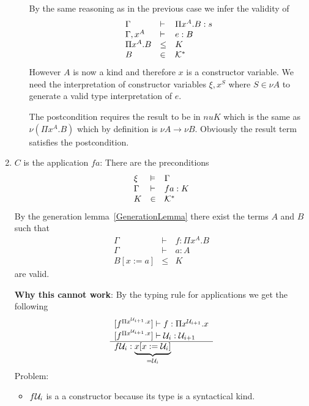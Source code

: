 \begin{definition}
\begin{enumerate}
\begin{enumerate}
            By the same reasoning as in the previous case we infer the validity
            of
            $$
            \begin{array}{lll}
                \Gamma &\vdash& \Pi x^A. B: s
                \\
                \Gamma,x^A &\vdash& e : B
                \\
                \Pi x^A. B &\le& K
                \\
                B &\in& {\cal K}^*
            \end{array}
            $$
            However $A$ is now a kind and therefore $x$ is a constructor
            variable. We need the interpretation of constructor variables
            $\xi,x^S$ where $S \in \nu A$ to generate a valid type
            interpretation of $e$.

            The postcondition requires the result to be in $nu K$ which is the
            same as $\nu (\Pi x^A.B)$ which by definition is $\nu A \to \nu B$.
            Obviously the result term satisfies the postcondition.

        \end{enumerate}

    \item $C$ is the application $f a$:
        There are the preconditions
        $$
        \begin{array}{lll}
            \xi &\vDash& \Gamma
            \\
            \Gamma &\vdash& f a: K
            \\
            K &\in& {\cal K}^*
        \end{array}
        $$
        By the generation lemma~\ref{GenerationLemma} there exist the terms $A$
        and $B$ such that
        $$
        \begin{array}{lll}
            \Gamma &\vdash& f: \Pi x^A. B
            \\
            \Gamma &\vdash& a: A
            \\
            B[x:=a] &\le& K
        \end{array}
        $$
        are valid.

        {\bf Why this cannot work}:
        By the typing rule for applications we get the following
        $$
        \begin{array}{l} 
            [f^{\Pi x^{{\cal U}_{i+1}}. x}] \vdash f: \Pi x^{{\cal U}_{i+1}}. x
            \\
            {[}f^{\Pi x^{{\cal U}_{i+1}}. x}] \vdash {\cal U}_i : {\cal U}_{i+1}
         \\ \hline 
            f {\cal U}_i:
            \underbrace{x[x:={\cal U}_i]}_{= {\cal U}_i}
        \end{array}
        $$
        Problem:
        \begin{itemize}
        \item $f {\cal U}_i$ is a a constructor because its type is a syntactical
            kind.


\end{itemize}
\end{enumerate}
\end{definition}
